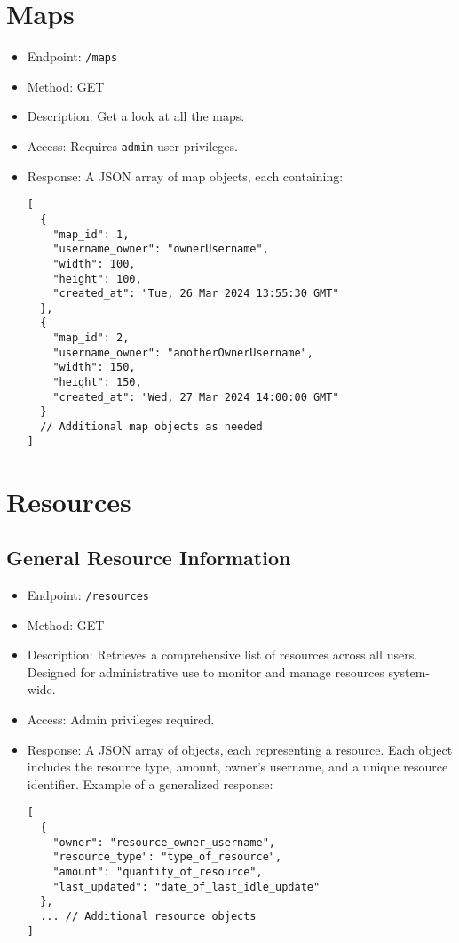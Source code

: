 \documentclass[12pt]{article}
\begin{document}
\section{Maps}
\begin{itemize}
    \item Endpoint: \texttt{/maps}
    \item Method: GET
    \item Description: Get a look at all the maps.
    \item Access: Requires \texttt{admin} user privileges.
    \item Response: A JSON array of map objects, each containing:
    \begin{verbatim}
[
  {
    "map_id": 1,
    "username_owner": "ownerUsername",
    "width": 100,
    "height": 100,
    "created_at": "Tue, 26 Mar 2024 13:55:30 GMT"
  },
  {
    "map_id": 2,
    "username_owner": "anotherOwnerUsername",
    "width": 150,
    "height": 150,
    "created_at": "Wed, 27 Mar 2024 14:00:00 GMT"
  }
  // Additional map objects as needed
]
    \end{verbatim}
\end{itemize}

\section{Resources}
\subsection{General Resource Information}
\begin{itemize}
    \item Endpoint: \texttt{/resources}
    \item Method: GET
    \item Description: Retrieves a comprehensive list of resources across all users. Designed for administrative use to monitor and manage resources system-wide.
    \item Access: Admin privileges required.
    \item Response: A JSON array of objects, each representing a resource. Each object includes the resource type, amount, owner's username, and a unique resource identifier. Example of a generalized response:
    \begin{verbatim}
[
  {
    "owner": "resource_owner_username",
    "resource_type": "type_of_resource",
    "amount": "quantity_of_resource",
    "last_updated": "date_of_last_idle_update"
  },
  ... // Additional resource objects
]
    \end{verbatim}
\end{itemize}
\end{document}
